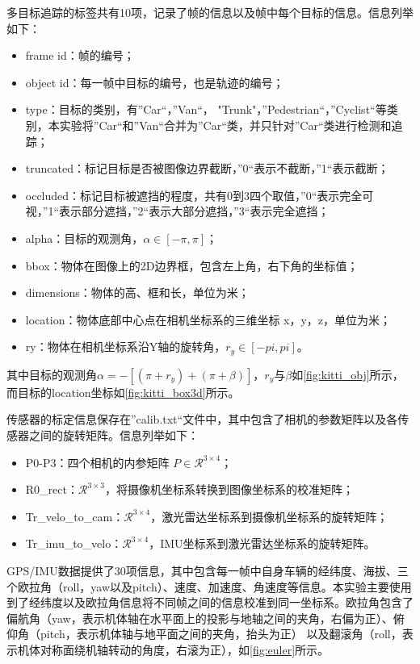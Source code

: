 多目标追踪的标签共有10项，记录了帧的信息以及帧中每个目标的信息。信息列举如下：
\begin{itemize}
	\item frame id：帧的编号；
	\item object id：每一帧中目标的编号，也是轨迹的编号；
	\item type：目标的类别，有”Car“，”Van“， "Trunk"，”Pedestrian“，”Cyclist“等类别，本实验将”Car“和”Van“合并为”Car“类，并只针对”Car“类进行检测和追踪；
	\item truncated：标记目标是否被图像边界截断，”0“表示不截断，”1“表示截断；
	\item occluded：标记目标被遮挡的程度，共有0到3四个取值，”0“表示完全可视，”1“表示部分遮挡，”2“表示大部分遮挡，”3“表示完全遮挡；
	\item alpha：目标的观测角，$\alpha \in [-\pi, \pi]$；
	\item bbox：物体在图像上的2D边界框，包含左上角，右下角的坐标值；
	\item dimensions：物体的高、框和长，单位为米；
	\item location：物体底部中心点在相机坐标系的三维坐标 x，y，z，单位为米；
	\item ry：物体在相机坐标系沿Y轴的旋转角，$r_y \in [-pi, pi]$。
\end{itemize}
其中目标的观测角$\alpha = -[(\pi+r_y) + (\pi+\beta)]$，$r_y$与$\beta$如\figurename \ref{fig:kitti_obj}所示，而目标的location坐标如\figurename \ref{fig:kitti_box3d}所示。


传感器的标定信息保存在”calib.txt“文件中，其中包含了相机的参数矩阵以及各传感器之间的旋转矩阵。信息列举如下：
\begin{itemize}
	\item P0-P3：四个相机的内参矩阵 $P \in \mathcal{R}^{3\times 4}$；
	\item R0\_rect：$\mathcal{R}^{3\times 3}$，将摄像机坐标系转换到图像坐标系的校准矩阵；
	\item Tr\_velo\_to\_cam：$\mathcal{R}^{3\times 4}$，激光雷达坐标系到摄像机坐标系的旋转矩阵；
	\item Tr\_imu\_to\_velo：$\mathcal{R}^{3\times 4}$，IMU坐标系到激光雷达坐标系的旋转矩阵。
\end{itemize}

GPS/IMU数据提供了30项信息，其中包含每一帧中自身车辆的经纬度、海拔、三个欧拉角（roll，yaw以及pitch）、速度、加速度、角速度等信息。本实验主要使用到了经纬度以及欧拉角信息将不同帧之间的信息校准到同一坐标系。欧拉角包含了偏航角（yaw，表示机体轴在水平面上的投影与地轴之间的夹角，右偏为正）、俯仰角（pitch，表示机体轴与地平面之间的夹角，抬头为正） 以及翻滚角（roll，表示机体对称面绕机轴转动的角度，右滚为正），如\figurename \ref{fig:euler}所示。

